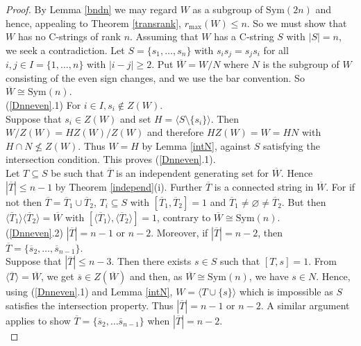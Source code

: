 \documentclass{amsart}
\numberwithin{equation}{section}
\theoremstyle{plain} %
\begin{document}
\begin{proof} By Lemma \ref{bndn} we may regard $W$ as a subgroup of $\mathrm{Sym}(2n)$ and hence, appealing to Theorem \ref{transrank}, $r_{\mathrm{max}}(W) \leq n$. So we must show that $W$ has no C-strings of rank $n$. Assuming that $W$ has a C-string $S$ with $|S| = n$, we seek a contradiction. Let $S = \{s_1, \dots , s_n \}$ with $s_i s_j =s_j s_i$ for all $i, j \in I = \{1, \dots , n \}$ with $|i - j| \geq 2$.  Put $\overline{W} = W/N$ where $N$ is the subgroup of $W$ consisting of the even sign changes, and we use the bar convention. So $\overline{W} \cong \mathrm{Sym}(n)$.\\

(\ref{Dnneven}.1) For $i \in I, s_i \notin Z(W)$.\\

Suppose that $s_i \in Z(W)$ and set $H = \langle S \setminus \{s_i \} \rangle$.  Then $W/Z(W) = HZ(W)/Z(W)$ and therefore $HZ(W) = W = HN$ with $H \cap N \not\leq Z(W)$. Thus $W = H$ by Lemma \ref{intN}, against $S$ satisfying the intersection condition. This proves (\ref{Dnneven}.1).\\

Let $T \subseteq S$ be such that $\overline{T}$ is an independent generating set for $\overline{W}$. Hence $|\overline{T}| \leq n - 1$ by Theorem \ref{independ}(i). Further $\overline{T}$ is a connected string in $\overline{W}$. For if not then $\overline{T} = \overline{T}_1 \cup \overline{T}_2$, $T_i \subseteq S$ with $[\overline{T}_1, \overline{T}_2] = 1$ and $\overline{T}_1 \not= \varnothing \not= \overline{T}_2$. But then $\langle \overline{T}_1 \rangle \langle \overline{T}_2 \rangle =  \overline{W}$ with $[\langle \overline{T}_1 \rangle ,  \langle \overline{T}_2 \rangle ] = 1$, contrary to $\overline{W} \cong \mathrm{Sym}(n)$.\\

(\ref{Dnneven}.2) $|\overline{T}| = n - 1$ or $n - 2$. Moreover, if $|\overline{T}| = n - 2$, then $\overline{T} = \{ \overline{s}_2,  \dots , \overline{s}_{n - 1} \}$.\\

Suppose that $|\overline{T}| \leq n - 3$. Then there exists $s \in S$ such that $[T,s] = 1$. From $\langle \overline{T} \rangle = \overline{W}$, we get $\overline{s} \in Z(\overline{W})$ and then, as $\overline{W} \cong \mathrm{Sym}(n)$, we have $s \in N$. Hence, using (\ref{Dnneven}.1) and Lemma \ref{intN}, $W = \langle T \cup \{s\} \rangle$ which is impossible as $S$ satisfies the intersection property. Thus $|\overline{T}| = n - 1$ or $n - 2$.  A similar argument applies to show $\overline{T} = \{ \overline{s}_2, \dots \overline{s}_{n - 1} \}$ when $|\overline{T}| = n - 2$.\\


\end{proof}
\end{document}
